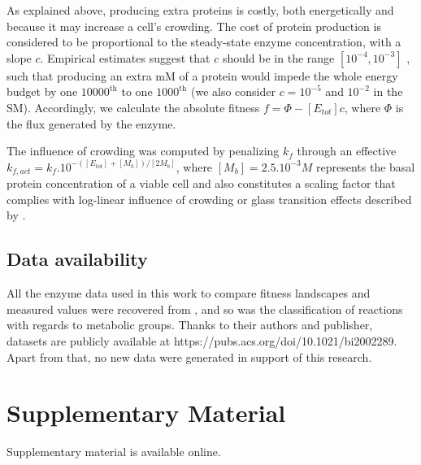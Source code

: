 \documentclass[11pt,onecolumn]{article}
\begin{document}
As explained above, producing extra proteins is costly, both energetically and because it may increase a cell's crowding. The cost of protein production is considered to be proportional to the steady-state enzyme concentration, with a slope $c$. Empirical estimates suggest that $c$ should be in the range $[10^{-4}, 10^{-3}]$ \citep{Wagner05,Lynch15}, such that producing an extra mM of a protein would impede the whole energy budget by one $10000^\text{th}$ to one $1000^\text{th}$ (we also consider $c=10^{-5}$ and $10^{-2}$ in the SM). Accordingly, we calculate the absolute fitness $f=\Phi-[E_{tot}]c$, where $\Phi$ is the flux generated by the enzyme. 

The influence of crowding was computed by penalizing $k_f$ through an effective $k_{f,act}=k_f.10^{-([E_{tot}]+[M_b])/[2M_b]}$, where $[M_b]=2.5.10^{-3}M$ represents the basal protein concentration of a viable cell and also constitutes a scaling factor that complies with \citet{Andrews20} log-linear influence of crowding or glass transition effects described by \citep{Dill11}.


\subsection{Data availability}

All the enzyme data used in this work to compare fitness landscapes and measured values were recovered from \citep{Bar-Even11}, and so was the classification of reactions with regards to metabolic groups. Thanks to their authors and publisher, datasets are publicly available at https://pubs.acs.org/doi/10.1021/bi2002289. Apart from that, no new data were generated in support of this research.

\section{Supplementary Material}

Supplementary material is available online. 

\end{document}
